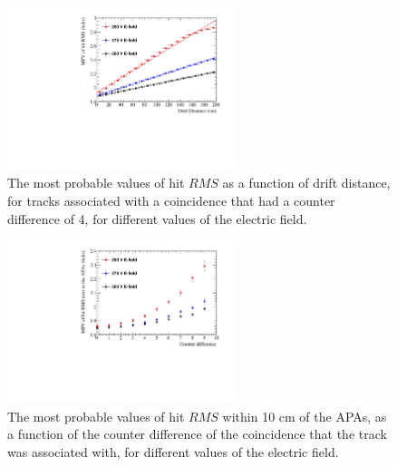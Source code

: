 \begin{figure}
  \centering
  \includegraphics[width=0.6\textwidth]{Canvas_CountDiff4_All_Positions_ElecField}
    \caption[The most probable values of hit $RMS$ as a function of drift distance, for tracks associated with a coincidence that had a counter difference of 4, for different values of the electric field]
          {The most probable values of hit $RMS$ as a function of drift distance, for tracks associated with a coincidence that had a counter difference of 4, for different values of the electric field.}
  \label{fig:DiffElecStudy_CDiff4}
\end{figure}

\begin{figure}
  \centering
  \includegraphics[width=0.6\textwidth]{Canvas_All_Angles_RMS0cm_ElecField}
  \caption[The angular dependence of hits within 10 cm of the APAs, for different values of the electric field]
          {The most probable values of hit $RMS$ within 10 cm of the APAs, as a function of the counter difference of the coincidence that the track was associated with, for different values of the electric field.}
  \label{fig:DiffElecStudy_RMS0cm}
\end{figure}


